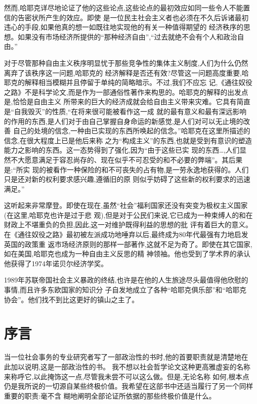 ﻿\documentclass[12pt]{article}
\begin{document}
然而,哈耶克详尽地论证了他的这些论点,这些论点的最初效应如同一些令人不能置信的告密状所产生的效应。即使
是一位民主社会主义者也必须在不久后诉诸最初违心的手段,如果他真的想一如既往地实现他的有关一种值得期望的
经济秩序的思想。如果没有市场经济所提供的``那种经济自由'',``过去就绝不会有个人和政治自由。''

对于尽管那种自由主义秩序明显忧于那些竞争性的集体主义制度,人们为什么仍然离弃了该秩序这一问题,哈耶克的
经济解释是否还有效?尽管这一问题高度重要,哈耶克的解释相当模糊并且停留于单纯的简略暗示。不过,我们不应忘
记,《通往奴役之路》不是科学论文,而是作为一部通俗性著作来构思的。哈耶克的解释的出发点是,恰恰是自由主义
所带来的巨大的经济成就会给自由主义带来灾难。它具有简直是``自我毁灭''的性质,``在将来很可能被看作这一成
就的最有意义和最有深远影响的作用的东西,是人们对于由自己掌握自身命运的新感觉,是人们对可以无止境的改善
自己的处境的信念,一种由已实现的东西所唤起的信念。''哈耶克在这里所描述的信念,在很大程度上已是他后来称
之为``构成主义''的东西,也就是受到有意识的塑造能力之影响的东西。这一态势得到了强化,因为``由于这些已实
现的东西\ldots ,人们显然不大愿意满足于容忍尚存的、现在似乎不可忍受的和不必要的弊端''。其后果是:``所实
现的被看作一种保险的和不可丧失的占有物,是一劳永逸地获得的。人们只是还对新的权利要求感兴趣,遵循旧的原
则似乎妨碍了这些新的权利要求的迅速满足。''

这听起来非常摩登。即使在现在,虽然``社会''福利国家还没有突变为极权主义国家(在这里,哈耶克也许是过于悲
观),但是对于公民们来说,它已成为一种束缚人的和在财政上不堪重负的负担,因此,这一对维护既得利益的思想的批
评有着巨大的意义。在《通往奴役之路》最初被左派成功地唾弃以后,最终成为80年代最强有力地启发英国的政策重
返市场经济原则的那样一部著作,这就不足为奇了。即使在其它国家,如在美国,哈耶克也成为一种自由主义反思的精
神领袖。他也受到了学术界的承认 \myrule 他获得了1974年诺贝尔经济学奖。

1989年苏联帝国社会主义暴政的终结,也许是在他的人生旅途尽头最值得他欣慰的事情,而且许多东欧国家的知识分
子自发地成立了各种``哈耶克俱乐部''和``哈耶克协会''。他们找不到比这更好的镇山之主了。

\section{序言}

当一位社会事务的专业研究者写了一部政治性的书时,他的首要职责就是清楚地在此加以说明,这是一部政治性的书。
我不想以社会哲学论文这种更高雅虚妄的名称来称呼它,以此掩饰这一点,尽管我未尝不可以这么做。但是,无论名称
如何,根本点仍是我所说的一切源自某些终极价值。我希望在这部书中还适当履行了另一个同样重要的职责:毫不含
糊地阐明全部论证所依据的那些终极价值是什么。
\end{document}
